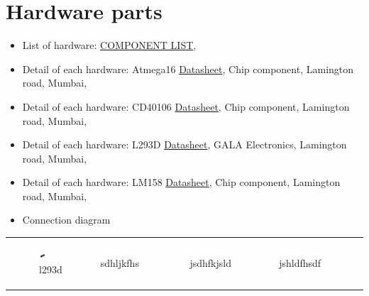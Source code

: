 \documentclass[a4paper,12pt,oneside]{book}
\begin{document}
\chapter[Hardware parts]{Hardware parts}
\begin{itemize}
  \item List of hardware: \href{./COMPONENT LIST}{COMPONENT LIST},
  \item Detail of each hardware: Atmega16 \href{./datasheet/atmega16.pdf}{Datasheet}, {Chip component, Lamington road, Mumbai}, 
  \item Detail of each hardware: CD40106 \href{./datasheet/CD40106.pdf}{Datasheet}, {Chip component, Lamington road, Mumbai}, 
  \item Detail of each hardware: L293D \href{./datasheet/L293.pdf}{Datasheet}, {GALA Electronics, Lamington road, Mumbai}, 
  \item Detail of each hardware: LM158 \href{./datasheet/lm158-n.pdf}{Datasheet}, {Chip component, Lamington road, Mumbai}, 
  \item Connection diagram
\end{itemize}
\begin{tabular}{p{0.25\linewidth} p{0.25\linewidth} p{0.25\linewidth} p{0.25\linewidth}}
	\begin{figure}
		\includegraphics[width=10px]{./l293d.jpeg}		
		\caption{l293d}
	\end{figure} & sdhljkfhs & jsdhfkjsld & jshldfhsdf\\
\end{tabular}
\end{document}
